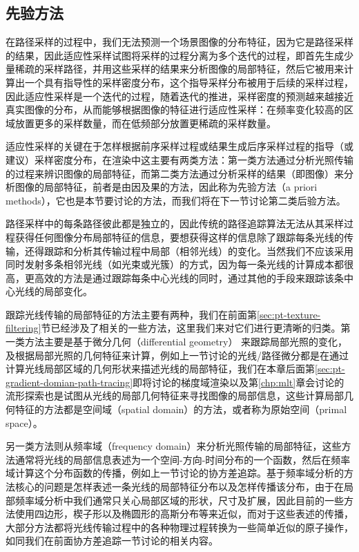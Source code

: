 \subsection{先验方法}
在路径采样的过程中，我们无法预测一个场景图像的分布特征，因为它是路径采样的结果，因此适应性采样试图将采样的过程分离为多个迭代的过程，即首先生成少量稀疏的采样路径，并用这些采样的结果来分析图像的局部特征，然后它被用来计算出一个具有指导性的采样密度分布，这个指导采样分布被用于后续的采样过程，因此适应性采样是一个迭代的过程，随着迭代的推进，采样密度的预测越来越接近真实图像的分布，从而能够根据图像的特征进行适应性采样：在频率变化较高的区域放置更多的采样数量，而在低频部分放置更稀疏的采样数量。

适应性采样的关键在于怎样根据前序采样过程或结果生成后序采样过程的指导（或建议）采样密度分布，在渲染中这主要有两类方法：第一类方法通过分析光照传输的过程来辨识图像的局部特征，而第二类方法通过分析采样的结果（即图像）来分析图像的局部特征，前者是由因及果的方法，因此称为先验方法（a priori methods），它也是本节要讨论的方法，而我们将在下一节讨论第二类后验方法。

路径采样中的每条路径彼此都是独立的，因此传统的路径追踪算法无法从其采样过程获得任何图像分布局部特征的信息，要想获得这样的信息除了跟踪每条光线的传输，还得跟踪和分析其传输过程中局部（相邻光线）的变化。当然我们不应该采用同时发射多条相邻光线（如光束或光簇）的方式，因为每一条光线的计算成本都很高，更高效的方法是通过跟踪每条中心光线的同时，通过其他的手段来跟踪该条中心光线的局部变化。

跟踪光线传输的局部特征的方法主要有两种，我们在前面第\ref{sec:pt-texture-filtering}节已经涉及了相关的一些方法，这里我们来对它们进行更清晰的归类。第一类方法主要是基于微分几何（differential geometry） 来跟踪局部光照的变化，及根据局部光照的几何特征来计算，例如上一节讨论的光线/路径微分都是在通过计算光线局部区域的几何形状来描述光线的局部特征，我们在本章后面第\ref{sec:pt-gradient-domian-path-tracing}即将讨论的梯度域渲染以及第\ref{chp:mlt}章会讨论的流形探索也是试图从光线的局部几何特征来寻找图像的局部信息，这些计算局部几何特征的方法都是空间域（spatial domain）的方法，或者称为原始空间（primal space）。

另一类方法则从频率域（frequency domain）来分析光照传输的局部特征，这些方法通常将光线的局部信息表述为一个空间-方向-时间分布的一个函数，然后在频率域计算这个分布函数的传播，例如上一节讨论的协方差追踪。基于频率域分析的方法核心的问题是怎样表述一条光线的局部特征分布以及怎样传播该分布，由于在局部频率域分析中我们通常只关心局部区域的形状，尺寸及扩展，因此目前的一些方法使用四边形\cite{a:AFrequencyAnalysisofLightTransport}，楔子形\cite{a:FrequencyAnalysisandShearedReconstructionforRenderingMotionBlur}以及椭圆形的高斯分布\cite{a:5DCovarianceTracingforEfficientDefocusandMotionBlur}等来近似，而对于这些表述的传播，大部分方法都将光线传输过程中的各种物理过程转换为一些简单近似的原子操作，如同我们在前面协方差追踪一节讨论的相关内容。

